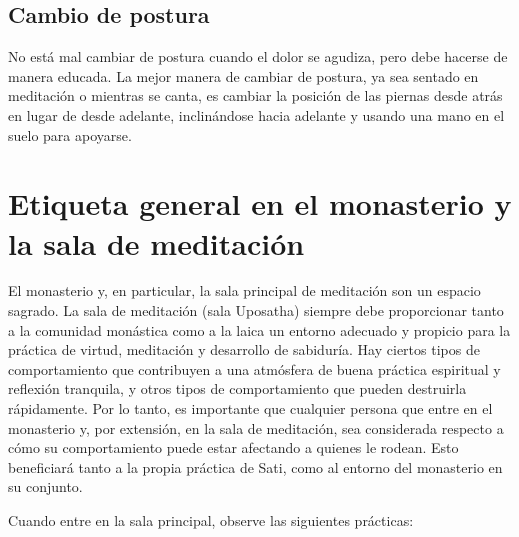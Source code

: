 \subsection{Cambio de postura}


No está mal cambiar de postura cuando el dolor se agudiza, pero debe hacerse de manera educada. La mejor manera de cambiar de postura, ya sea sentado en meditación o mientras se canta, es cambiar la posición de las piernas desde atrás en lugar de desde adelante, inclinándose hacia adelante y usando una mano en el suelo para apoyarse.
\clearpage

\section{Etiqueta general en el monasterio y la sala de meditación}

El monasterio y, en particular, la sala principal de meditación son un espacio sagrado. La sala de meditación (sala Uposatha) siempre debe proporcionar tanto a la comunidad monástica como a la laica un entorno adecuado y propicio para la práctica de virtud, meditación y desarrollo de sabiduría. Hay ciertos tipos de comportamiento que contribuyen a una atmósfera de buena práctica espiritual y reflexión tranquila, y otros tipos de comportamiento que pueden destruirla rápidamente. Por lo tanto, es importante que cualquier persona que entre en el monasterio y, por extensión, en la sala de meditación, sea considerada respecto a cómo su comportamiento puede estar afectando a quienes le rodean. Esto beneficiará tanto a la propia práctica de Sati, como al entorno del monasterio en su conjunto.

Cuando entre en la sala principal, observe las siguientes prácticas:


